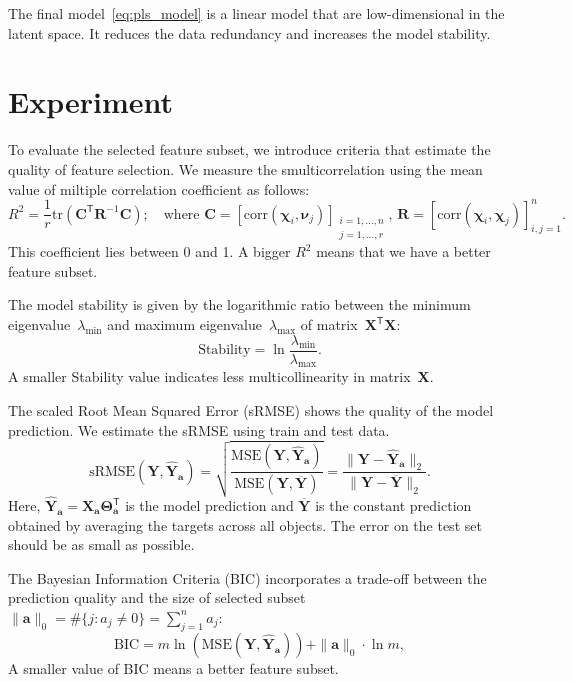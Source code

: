 \documentclass[preprint,12pt]{elsarticle}
\theoremstyle{definition}
\newcommand{\ba}{\mathbf{a}}
\newcommand{\bY}{\mathbf{Y}}
\newcommand{\bX}{\mathbf{X}}
\newcommand{\bC}{\mathbf{C}}
\newcommand{\T}{\mathsf{T}}
\newcommand{\bchi}{\boldsymbol{\chi}}
\newcommand{\bnu}{\boldsymbol{\nu}}
\newcommand{\bTheta}{\boldsymbol{\Theta}}
\begin{document}
The final model~\eqref{eq:pls_model} is a linear model that are low-dimensional in the latent space. 
It reduces the data redundancy and increases the model stability. 

\section{Experiment}

To evaluate the selected feature subset, we introduce criteria that estimate the quality of feature selection.
We measure the smulticorrelation using the mean value of miltiple correlation coefficient as follows:
\begin{equation*}
R^2 = \frac{1}{r} \text{tr} \left( \bC^{\T} \mathbf{R}^{-1} \bC \right); \quad \text{where }\bC = [ \text{corr}(\bchi_i, \bnu_j)]_{\substack{i=1, \dots, n \\ j=1, \dots, r}}, \, \mathbf{R} = [ \text{corr}(\bchi_i, \bchi_j)]_{i, j = 1}^n.
\end{equation*}
This coefficient lies between 0 and 1. A bigger $R^2$ means that we have a better feature subset.

The model stability is given by the logarithmic ratio between the minimum eigenvalue~$\lambda_{\min}$ and maximum eigenvalue~$\lambda_{\max}$ of matrix~$\bX^{\T} \bX$:
\begin{equation*}
\text{Stability} = \ln \frac{\lambda_{\min}}{\lambda_{\max}}.
\end{equation*}
A smaller Stability value indicates less multicollinearity in matrix~$\bX$.

The scaled Root Mean Squared Error (sRMSE) shows the quality of the model prediction. We estimate the sRMSE using train and test data.
\begin{equation*}
\text{sRMSE}(\bY, \widehat{\bY}_{\ba}) = \sqrt{\frac{\text{MSE} (\bY, \widehat{\bY}_{\ba})}{\text{MSE} (\bY, \overline{\bY})}} =  \frac{\| \bY - \widehat{\bY}_{\ba} \|_2}{\| \bY - \overline{\bY} \|_2}.
\end{equation*}
Here, $\widehat{\bY}_{\ba} = \bX_{\ba} \bTheta_{\ba}^{\T}$ is the model prediction and $\overline{\bY}$ is the constant prediction obtained by averaging the targets across all objects.
The error on the test set should be as small as possible.

The Bayesian Information Criteria (BIC) incorporates a trade-off between the prediction quality and the size of selected subset~$\|\ba\|_0 = \#\{j: a_j \neq 0\}= \sum_{j=1}^n a_j$:
\begin{equation*}
\text{BIC} = m \ln \left( \text{MSE} ( \bY, \widehat{\bY}_{\ba})\right) + \| \ba \|_0 \cdot \ln m,
\end{equation*}
A smaller value of BIC means a better feature subset.
\end{document}
